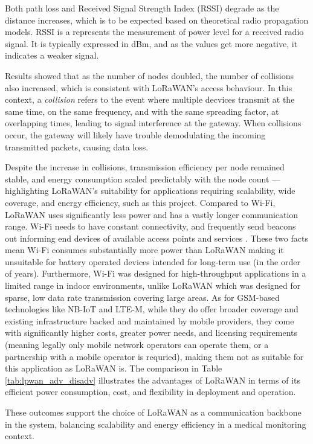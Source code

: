 Both path loss and Received Signal Strength Index (RSSI) degrade as the distance increases, which is to be expected based on theoretical radio propagation models. RSSI is a represents the measurement of power level for a received radio signal. It is typically expressed in dBm, and as the values get more negative, it indicates a weaker signal.

Results showed that as the number of nodes doubled, the number of collisions also increased, which is consistent with LoRaWAN's access behaviour. In this context, a \textit{collision} refers to the event where multiple decvices transmit at the same time, on the same frequency, and with the same spreading factor, at overlapping times, leading to signal interference at the gateway. When collisions occur, the gateway will likely have trouble demodulating the incoming transmitted packets, causing data loss.

Despite the increase in collisions, transmission efficiency per node remained stable, and energy consumption scaled predictably with the node count --- highlighting LoRaWAN's suitability for applications requiring scalability, wide coverage, and energy efficiency, such as this project. Compared to Wi-Fi, LoRaWAN uses significantly less power and has a vastly longer communication range. Wi-Fi needs to have constant connectivity, and frequently send beacons out informing end devices of available access points and services \cite{wifi_beacons}. These two facts mean Wi-Fi consumes substantially more power than LoRaWAN making it unsuitable for battery operated devices intended for long-term use (in the order of years). Furthermore, Wi-Fi was designed for high-throughput applications in a limited range in indoor environments, unlike LoRaWAN which was designed for sparse, low data rate transmission covering large areas. As for GSM-based technologies like NB-IoT and LTE-M, while they do offer broader coverage and existing infrastructure backed and maintained by mobile providers, they come with significantly higher costs, greater power needs, and licensing requirements (meaning legally only mobile network operators can operate them, or a partnership with a mobile operator is requried), making them not as suitable for this application as LoRaWAN is. The comparison in Table \ref{tab:lpwan_adv_disadv} illustrates the advantages of LoRaWAN in terms of its efficient power consumption, cost, and flexibility in deployment and operation.

These outcomes support the choice of LoRaWAN as a communication backbone in the system, balancing scalability and energy efficiency in a medical monitoring context.

